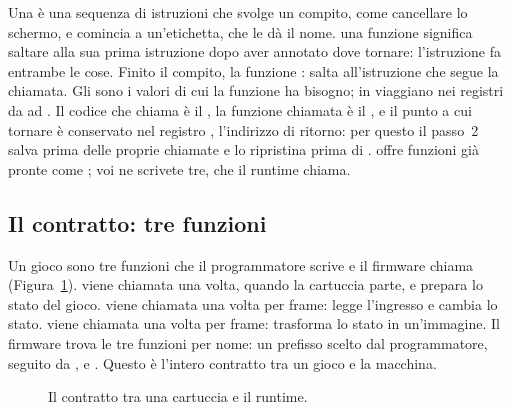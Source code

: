 Una  è una sequenza di istruzioni che svolge un compito, come
cancellare lo schermo, e comincia a un'etichetta, che le dà il nome.
 una funzione significa saltare alla sua prima istruzione dopo
aver annotato dove tornare: l'istruzione  fa entrambe le cose. Finito
il compito, la funzione :  salta all'istruzione che segue
la chiamata. Gli  sono i valori di cui la funzione ha bisogno;
in \riscv viaggiano nei registri da  ad . Il codice che chiama è
il , la funzione chiamata è il , e il punto a cui
tornare è conservato nel registro , l'indirizzo di ritorno: per questo
il passo~2 salva  prima delle proprie chiamate e lo ripristina prima di
. \prg offre funzioni già pronte come ; voi ne
scrivete tre, che il runtime chiama.

\subsection{Il contratto: tre funzioni}

Un gioco \prg sono tre funzioni che il programmatore scrive e il firmware
chiama (Figura~\ref{fig:fc:contract}).  viene chiamata una volta,
quando la cartuccia parte, e prepara lo stato del gioco.  viene
chiamata una volta per frame: legge l'ingresso e cambia lo stato. 
viene chiamata una volta per frame: trasforma lo stato in un'immagine. Il
firmware trova le tre funzioni per nome: un prefisso scelto dal programmatore,
seguito da ,  e . Questo è l'intero
contratto tra un gioco e la macchina.

\begin{figure}[htb]
\centering
{}
\caption{Il contratto tra una cartuccia e il runtime.}
\label{fig:fc:contract}
\end{figure}

